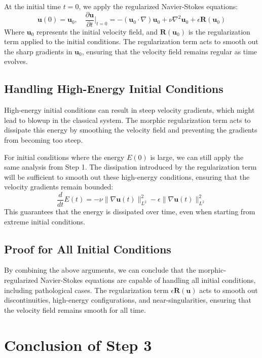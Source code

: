 \documentclass{article}
\begin{document}
At the initial time \( t = 0 \), we apply the regularized Navier-Stokes equations:
\[
\mathbf{u}(0) = \mathbf{u}_0, \quad \frac{\partial \mathbf{u}}{\partial t}\Big|_{t=0} = -(\mathbf{u}_0 \cdot \nabla)\mathbf{u}_0 + \nu \nabla^2 \mathbf{u}_0 + \epsilon \mathbf{R}(\mathbf{u}_0)
\]
Where \( \mathbf{u}_0 \) represents the initial velocity field, and \( \mathbf{R}(\mathbf{u}_0) \) is the regularization term applied to the initial conditions. The regularization term acts to smooth out the sharp gradients in \( \mathbf{u}_0 \), ensuring that the velocity field remains regular as time evolves.

\subsection*{Handling High-Energy Initial Conditions}

High-energy initial conditions can result in steep velocity gradients, which might lead to blowup in the classical system. The morphic regularization term acts to dissipate this energy by smoothing the velocity field and preventing the gradients from becoming too steep. 

For initial conditions where the energy \( E(0) \) is large, we can still apply the same analysis from Step 1. The dissipation introduced by the regularization term will be sufficient to smooth out these high-energy conditions, ensuring that the velocity gradients remain bounded:
\[
\frac{d}{dt} E(t) = -\nu \|\nabla \mathbf{u}(t)\|_{L^2}^2 - \epsilon \|\nabla \mathbf{u}(t)\|_{L^2}^2
\]
This guarantees that the energy is dissipated over time, even when starting from extreme initial conditions.

\subsection*{Proof for All Initial Conditions}

By combining the above arguments, we can conclude that the morphic-regularized Navier-Stokes equations are capable of handling all initial conditions, including pathological cases. The regularization term \( \epsilon \mathbf{R}(\mathbf{u}) \) acts to smooth out discontinuities, high-energy configurations, and near-singularities, ensuring that the velocity field remains smooth for all time.

\section*{Conclusion of Step 3}
\end{document}
